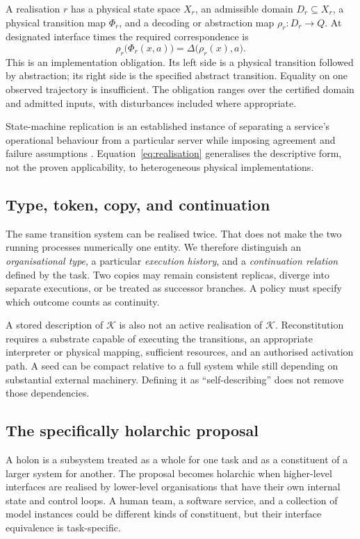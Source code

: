 \documentclass[11pt,a4paper]{article}
\theoremstyle{definition}
\theoremstyle{remark}
\newcommand{\calK}{\mathcal{K}}
\begin{document}
A realisation $r$ has a physical state space $X_r$, an admissible domain $D_r\subseteq X_r$, a physical transition map $\Phi_r$, and a decoding or abstraction map $\rho_r:D_r\to Q$. At designated interface times the required correspondence is
\begin{equation}\label{eq:realisation}
 \rho_r\bigl(\Phi_r(x,a)\bigr)=\Delta\bigl(\rho_r(x),a\bigr).
\end{equation}
This is an implementation obligation. Its left side is a physical transition followed by abstraction; its right side is the specified abstract transition. Equality on one observed trajectory is insufficient. The obligation ranges over the certified domain and admitted inputs, with disturbances included where appropriate.

State-machine replication is an established instance of separating a service's operational behaviour from a particular server while imposing agreement and failure assumptions \citep{schneider}. Equation~\eqref{eq:realisation} generalises the descriptive form, not the proven applicability, to heterogeneous physical implementations.

\subsection{Type, token, copy, and continuation}
The same transition system can be realised twice. That does not make the two running processes numerically one entity. We therefore distinguish an \emph{organisational type}, a particular \emph{execution history}, and a \emph{continuation relation} defined by the task. Two copies may remain consistent replicas, diverge into separate executions, or be treated as successor branches. A policy must specify which outcome counts as continuity.

A stored description of $\calK$ is also not an active realisation of $\calK$. Reconstitution requires a substrate capable of executing the transitions, an appropriate interpreter or physical mapping, sufficient resources, and an authorised activation path. A seed can be compact relative to a full system while still depending on substantial external machinery. Defining it as ``self-describing'' does not remove those dependencies.

\subsection{The specifically holarchic proposal}
A holon is a subsystem treated as a whole for one task and as a constituent of a larger system for another. The proposal becomes holarchic when higher-level interfaces are realised by lower-level organisations that have their own internal state and control loops. A human team, a software service, and a collection of model instances could be different kinds of constituent, but their interface equivalence is task-specific.
\end{document}
